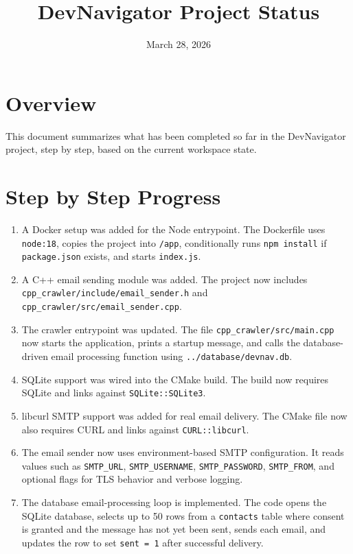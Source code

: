 \documentclass[11pt]{article}
\title{DevNavigator Project Status}
\author{}
\date{March 28, 2026}
\begin{document}
\maketitle

\section*{Overview}
This document summarizes what has been completed so far in the DevNavigator project, step by step, based on the current workspace state.

\section*{Step by Step Progress}
\begin{enumerate}
  \item A Docker setup was added for the Node entrypoint. The Dockerfile uses \texttt{node:18}, copies the project into \texttt{/app}, conditionally runs \texttt{npm install} if \texttt{package.json} exists, and starts \texttt{index.js}.

  \item A C++ email sending module was added. The project now includes \texttt{cpp\_crawler/include/email\_sender.h} and \texttt{cpp\_crawler/src/email\_sender.cpp}.

  \item The crawler entrypoint was updated. The file \texttt{cpp\_crawler/src/main.cpp} now starts the application, prints a startup message, and calls the database-driven email processing function using \texttt{../database/devnav.db}.

  \item SQLite support was wired into the CMake build. The build now requires SQLite and links against \texttt{SQLite::SQLite3}.

  \item libcurl SMTP support was added for real email delivery. The CMake file now also requires CURL and links against \texttt{CURL::libcurl}.

  \item The email sender now uses environment-based SMTP configuration. It reads values such as \texttt{SMTP\_URL}, \texttt{SMTP\_USERNAME}, \texttt{SMTP\_PASSWORD}, \texttt{SMTP\_FROM}, and optional flags for TLS behavior and verbose logging.

  \item The database email-processing loop is implemented. The code opens the SQLite database, selects up to 50 rows from a \texttt{contacts} table where consent is granted and the message has not yet been sent, sends each email, and updates the row to set \texttt{sent = 1} after successful delivery.


\end{enumerate}
\end{document}
